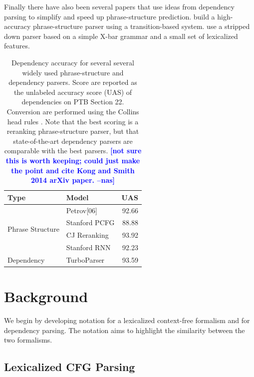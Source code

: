 \documentclass[11pt,letterpaper]{article}
\newcommand{\nascomment}[1]{\textcolor{blue}{\bf \small [#1 --nas]}}
\begin{document}
Finally there have also been several papers that use ideas from
dependency parsing to simplify and speed up phrase-structure prediction.
 build a high-accuracy phrase-structure parser
using a transition-based system.  use a stripped
down parser based on a simple X-bar grammar and a small set of lexicalized features.





\begin{table}
  \centering
  \small
  \begin{tabular}{|l|l|r|}
    \hline
    Type & Model & UAS  \\
    \hline

    \hline
    \multirow{4}{*}{Phrase Structure} & Petrov[06] & 92.66   \\
    & Stanford PCFG & 88.88 \\
    & CJ Reranking & 93.92 \\
    & Stanford RNN & 92.23 \\
    \hline
    \multirow{1}{*}{Dependency} & TurboParser & 93.59  \\
    \hline
  \end{tabular}
  \caption{Dependency accuracy for several several widely used phrase-structure and dependency parsers.
    Score are reported as the unlabeled accuracy score (UAS) of dependencies on PTB  Section 22.
    Conversion are performed using the Collins head rules \cite{collins2003head}.
    Note that the best scoring is a reranking phrase-structure parser, but that state-of-the-art
    dependency parsers are comparable with the best parsers.
    \nascomment{not sure this is worth keeping; could just make the
      point and cite Kong and Smith 2014 arXiv paper.}}
  \label{fig:depcomp}
\end{table}




\section{Background}

We begin by developing notation for a lexicalized context-free formalism and for dependency parsing. The notation aims to highlight the similarity between the two formalisms.

\subsection{Lexicalized CFG Parsing}
\end{document}
